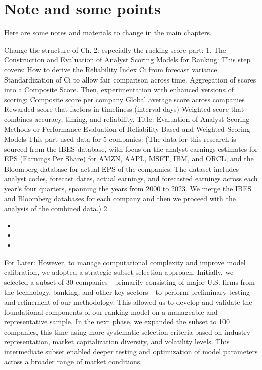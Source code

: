 \chapter{Note and some points}

Here are some notes and materials to change in the main chapters.

Change the structure of Ch. 2: especially the racking score part: 
1. The Construction and Evaluation of Analyst Scoring Models for Ranking: 
This step covers:
How to derive the Reliability Index Ci from forecast variance.
Standardization of Ci to allow fair comparison across time.
Aggregation of scores into a Composite Score.
Then, experimentation with enhanced versions of scoring:
Composite score per company
Global average score across companies
Rewarded score that factors in timeliness (interval days)
Weighted score that combines accuracy, timing, and reliability.
Title: 
\noindent Evaluation of Analyst Scoring Methods  or Performance Evaluation of Reliability-Based and Weighted Scoring Models
This part used data for 5 companies: (The data for this research is sourced from the IBES database, with focus on the analyst earnings estimates for EPS (Earnings Per Share) for AMZN, AAPL, MSFT, IBM, and ORCL, and the Bloomberg database for actual EPS of the companies. The dataset includes analyst codes, forecast dates, actual earnings, and forecasted earnings across each year’s four quarters, spanning the years from 2000 to 2023. We merge the IBES and Bloomberg databases for each company and then we proceed with the analysis of the combined data.)
 2. 

\begin{itemize}
    \item 
    \item 
    \item
\end{itemize}

 For Later: However, to manage computational complexity and improve model calibration, we adopted a strategic subset selection approach. Initially, we selected a subset of 30 companies—primarily consisting of major U.S. firms from the technology, banking, and other key sectors—to perform preliminary testing and refinement of our methodology. This allowed us to develop and validate the foundational components of our ranking model on a manageable and representative sample. In the next phase, we expanded the subset to 100 companies, this time using more systematic selection criteria based on industry representation, market capitalization diversity, and volatility levels. This intermediate subset enabled deeper testing and optimization of model parameters across a broader range of market conditions.

